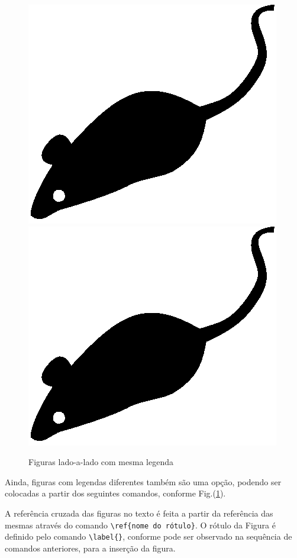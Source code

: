 \documentclass[12pt,A4,A4pt]{article}
\begin{document}
{\begin{figure}[htbp]
\centering
\includegraphics[scale=0.8]{mouse}
\quad
\includegraphics[scale=0.5]{mouse}
\caption{\fontsize{10pt}{\baselineskip}\selectfont Figuras lado-a-lado com mesma legenda}
\label{fig:lado_a_lado}
\end{figure}


Ainda, figuras com legendas diferentes também são uma opção, podendo ser colocadas a partir dos seguintes comandos, conforme Fig.(\ref{fig:lado_a_lado}).

A referência cruzada das figuras no texto é feita a partir da referência das mesmas através do comando \verb|\ref{nome do rótulo}|. O rótulo da Figura é definido pelo comando \verb|\label{}|, conforme pode ser observado na sequência de comandos anteriores, para a inserção da figura.

}
\end{document}

